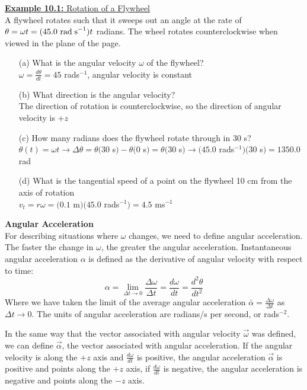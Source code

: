 \documentclass[a4paper]{article}
\let\bf\textbf
\newcommand\der[2]{\frac{d #1}{d #2}}
\begin{document}
\begin{shaded}
    \underline{\bf{Example 10.1:} Rotation of a Flywheel}
    \vspace{2mm}\\
    A flywheel rotates such that it sweeps out an angle at the rate of $\theta = \omega t = (45.0\text{ rad\;s}^{-1})t$ radians. The wheel rotates counterclockwise when viewed in the plane of the page.
    \begin{enumerate}
        \item[(a)] What is the angular velocity $\omega$ of the flywheel?
        \vspace{1mm}\\
        $\displaystyle \omega = \der{\theta}{t} = 45$ rad\;s$^{-1}$, angular velocity is constant
        \item[(b)] What direction is the angular velocity?
        \vspace{1mm}\\
        The direction of rotation is counterclockwise, so the direction of angular velocity is $+z$
        \item[(c)] How many radians does the flywheel rotate through in 30 s?
        \vspace{1mm}\\
        $\displaystyle \theta(t) = \omega t \to \Delta\theta = \theta(30$ s$) - \theta(0$ s$) = \theta(30$ s$) \to (45.0$ rad\;s$^{-1})(30$ s$) = 1350.0$ rad
        \item[(d)] What is the tangential speed of a point on the flywheel 10 cm from the axis of rotation
        \vspace{1mm}\\
        $v_t = r\omega = (0.1$ m$)(45.0$ rad\;s$^{-1}) = 4.5$ ms$^{-1}$
    \end{enumerate}
\end{shaded}
\newpage
\noindent\bf{Angular Acceleration}
\vspace{2mm}\\
For describing situations where $\omega$ changes, we need to define angular acceleration. The faster the change in $\omega$, the greater the angular acceleration. Instantaneous angular acceleration $\alpha$ is defined as the derivative of angular velocity with respect to time:
\begin{equation}
    \alpha = \lim_{\Delta t \to 0}\frac{\Delta\omega}{\Delta t} = \der{\omega}{t} = \frac{d^2\theta}{dt^2}
\end{equation}
Where we have taken the limit of the average angular acceleration $\bar{\alpha} = \frac{\Delta\omega}{\Delta t}$ as $\Delta t \to 0$. The units of angular acceleration are radians/s per second, or rad\;s$^{-2}$. 
\vspace{1mm}\par
\noindent In the same way that the vector associated with angular velocity $\vec{\omega}$ was defined, we can define $\vec{\alpha}$, the vector associated with angular acceleration. If the angular velocity is along the $+z$ axis and $\der{\omega}{t}$ is positive, the angular acceleration $\vec{\alpha}$ is positive and points along the $+z$ axis, if $\der{\omega}{t}$ is negative, the angular acceleration is negative and points along the $-z$ axis.
\end{document}

